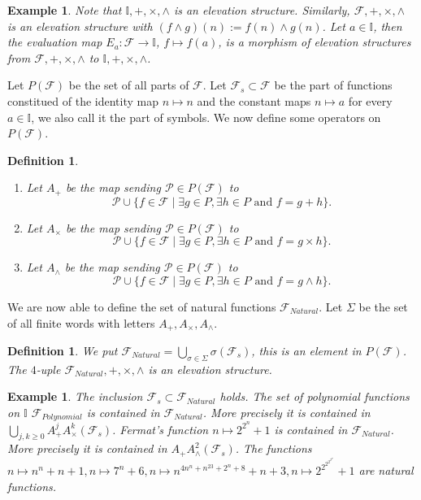 \documentclass{alggeom}
\renewcommand{\geq}{\geqslant}
\newtheorem{defi}[theo]{Definition}
\newtheorem{exam}[theo]{Example}
\newcommand{\I}{\mathbb{I}}
\begin{document}
\begin{exam} Note that $\I,+,\times , \wedge$ is an elevation structure. Similarly, $\mathscr{F},+, \times , \wedge$ is an elevation structure with $(f \wedge g )(n) := f(n) \wedge g(n)$.
 Let $a \in \I$, then the evaluation map $E_a:\mathscr{F} \to \I$, $f \mapsto f(a)$, is a morphism of elevation structures from  $\mathscr{F} ,+, \times , \wedge $ to $ \I, +,\times , \wedge$.
\end{exam}


Let $P (\mathscr{F}) $ be the set of all parts of  $\mathscr{F}$. Let $\mathscr{F}_s \subset \mathscr{F}$ be the part of functions constitued of the identity map $n \mapsto n$ and the constant maps $n \mapsto a$ for every $a \in \I$, we also call it the part of symbols.
We now define some operators on $P(\mathscr{F} )$.

\begin{defi} $~~$

\begin{enumerate}
\item Let $A_+$ be the map sending $\mathscr{P} \in P(\mathscr{F} ) $ to \[ \mathscr{P} \cup \{ f \in \mathscr{F} \mid \exists g\in P, \exists h \in P  \text{ and } f=g+h \}  .\]
\item Let $A_{\times}$ be the map sending $\mathscr{P}  \in P(\mathscr{F} ) $ to \[\mathscr{P}  \cup  \{ f \in \mathscr{F} \mid \exists g\in P, \exists h \in P  \text{ and } f=g \times h \} .\]
\item Let $A_{\wedge}$ be the map sending $\mathscr{P}  \in P(\mathscr{F} ) $ to \[ \mathscr{P}  \cup \{ f \in \mathscr{F} \mid \exists g\in P, \exists h \in P  \text{ and } f=g \wedge h \} .\]
\end{enumerate}

\end{defi}

We are now able to define the set of natural functions $\mathscr{F} _{Natural}$. Let $\Sigma$ be the set of all finite words with letters $A_+ , A_{\times} , A _{\wedge}$.

\begin{defi} \label{natfct} We put $\mathscr{F} _{Natural} = \displaystyle \bigcup _{\sigma \in \Sigma } \sigma ( \mathscr{F}_s)$, this is an element in $P(\mathscr{F} ) $. The $4$-uple $\mathscr{F} _{Natural} , + , \times , \wedge $ is an elevation structure.

\end{defi}

\begin{exam}The inclusion $\mathscr{F}_s \subset \mathscr{F} _{Natural}$ holds.
 The set of polynomial functions on $\I$ $\mathscr{F} _{Polynomial}$ is contained in $\mathscr{F} _{Natural}$. More precisely it is contained in $ \displaystyle \bigcup _{j,k \geq 0} A_+^j A_{\times} ^k (\mathscr{F} _s )$. 
 Fermat's function $n \mapsto 2^{2^n} +1 $ is contained in $\mathscr{F} _{Natural}$. More precisely it is contained in $A_+ A_{\wedge} ^2 ( \mathscr{F} _s )$.
 The functions $
n \mapsto n^n+n+1 ,
n \mapsto 7^n+6 ,
n  \mapsto  n^{4n^n +n^{23}+2^n+8} +n+3,
n  \mapsto 2^{2^{2^{2^{2^{2^n}}}}}+1 $
are natural functions.

\end{exam}
\end{document}
